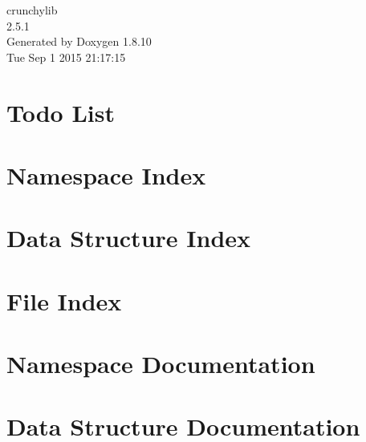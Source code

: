 \documentclass[twoside]{book}
\newcommand{\+}{\discretionary{\mbox{\scriptsize$\hookleftarrow$}}{}{}}
\newcommand{\clearemptydoublepage}{%
  \newpage{\pagestyle{empty}\cleardoublepage}%
}
\begin{document}
\hypersetup{pageanchor=false,
             bookmarks=true,
             bookmarksnumbered=true,
             pdfencoding=unicode
            }
\begin{titlepage}
\vspace*{7cm}
\begin{center}%
{\Large crunchylib \\[1ex]\large 2.\+5.\+1 }\\
\vspace*{1cm}
{\large Generated by Doxygen 1.8.10}\\
\vspace*{0.5cm}
{\small Tue Sep 1 2015 21:17:15}\\
\end{center}
\end{titlepage}
\clearemptydoublepage
\tableofcontents
\clearemptydoublepage
{}
\hypersetup{pageanchor=true}

\chapter{Todo List}
\label{todo}
\hypertarget{todo}{}

\chapter{Namespace Index}

\chapter{Data Structure Index}

\chapter{File Index}

\chapter{Namespace Documentation}






\chapter{Data Structure Documentation}
















\end{document}
